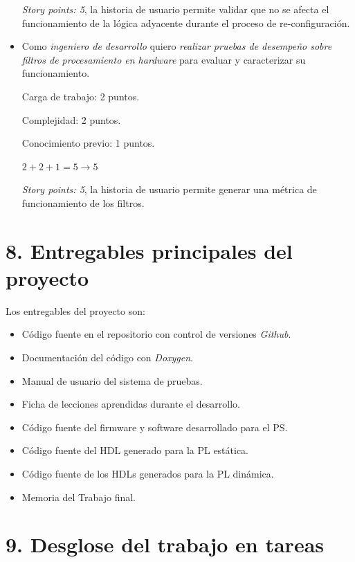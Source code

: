 \documentclass[
11pt, %
]{charter}
\begin{document}
\begin{itemize}
	\emph{Story points: 5}, la historia de usuario permite validar que no se afecta el funcionamiento de la lógica adyacente durante el proceso de re-configuración.

	\item Como \emph{ingeniero de desarrollo} quiero \emph{realizar pruebas de desempeño sobre filtros de procesamiento en hardware} para evaluar y caracterizar su funcionamiento.
			
	Carga de trabajo: 2 puntos.

	Complejidad: 2 puntos.

	Conocimiento previo: 1 puntos.

	\begin{center}
		$ 2 + 2 + 1 = 5 \rightarrow 5 $
	\end{center}

	\emph{Story points: 5}, la historia de usuario permite generar una métrica de funcionamiento de los filtros.

\end{itemize}	

\section{8. Entregables principales del proyecto}
\label{sec:entregables}

Los entregables del proyecto son:

\begin{itemize}
	\item Código fuente en el repositorio con control de versiones \emph{Github}.
	\item Documentación del código con \emph{Doxygen}.
	\item Manual de usuario del sistema de pruebas.
	\item Ficha de lecciones aprendidas durante el desarrollo.
	\item Código fuente del firmware y software desarrollado para el PS.
	\item Código fuente del HDL generado para la PL estática.
	\item Código fuente de los HDLs generados para la PL dinámica.
	\item Memoria del Trabajo final.
\end{itemize}

\newpage

\section{9. Desglose del trabajo en tareas}
\label{sec:wbs}
\end{document}

